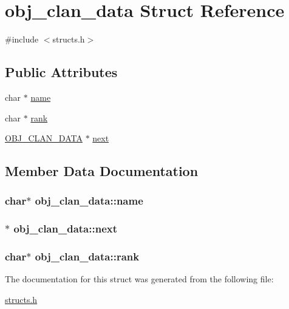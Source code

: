 \hypertarget{structobj__clan__data}{\section{obj\-\_\-clan\-\_\-data Struct Reference}
\label{structobj__clan__data}
}


{\ttfamily \#include $<$structs.\-h$>$}

\subsection*{Public Attributes}
\begin{DoxyCompactItemize}
\item 
char $\ast$ \hyperlink{structobj__clan__data_a47b83061cf091f47ee8e25601bd64e4e}{name}
\item 
char $\ast$ \hyperlink{structobj__clan__data_a4a7e2b5c39a85d62df8e746823552dc1}{rank}
\item 
\hyperlink{structs_8h_a0567cf0e911b537bd58e7b0fb58f34b1}{O\-B\-J\-\_\-\-C\-L\-A\-N\-\_\-\-D\-A\-T\-A} $\ast$ \hyperlink{structobj__clan__data_a62b665b5417bb431384e219d4dc212af}{next}
\end{DoxyCompactItemize}


\subsection{Member Data Documentation}
\hypertarget{structobj__clan__data_a47b83061cf091f47ee8e25601bd64e4e}{
\subsubsection[{name}]{\setlength{\rightskip}{0pt plus 5cm}char$\ast$ obj\-\_\-clan\-\_\-data\-::name}}\label{structobj__clan__data_a47b83061cf091f47ee8e25601bd64e4e}
\hypertarget{structobj__clan__data_a62b665b5417bb431384e219d4dc212af}{
\subsubsection[{next}]{$\ast$ obj\-\_\-clan\-\_\-data\-::next}}\label{structobj__clan__data_a62b665b5417bb431384e219d4dc212af}
\hypertarget{structobj__clan__data_a4a7e2b5c39a85d62df8e746823552dc1}{
\subsubsection[{rank}]{\setlength{\rightskip}{0pt plus 5cm}char$\ast$ obj\-\_\-clan\-\_\-data\-::rank}}\label{structobj__clan__data_a4a7e2b5c39a85d62df8e746823552dc1}


The documentation for this struct was generated from the following file\-:\begin{DoxyCompactItemize}
\item 
\hyperlink{structs_8h}{structs.\-h}\end{DoxyCompactItemize}
